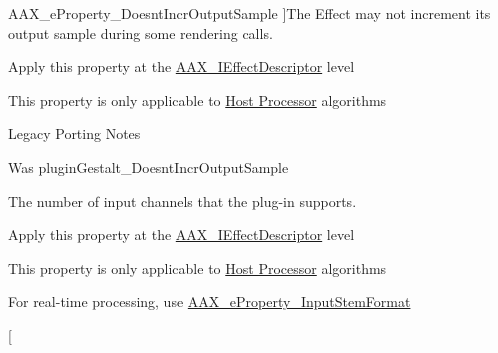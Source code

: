 \begin{Desc}
\begin{description}
{\hypertarget{a00283_a6571f4e41a5dd06e4067249228e2249eaaf6b47f0861af74ef5c5bb316481b97d}{}A\+A\+X\+\_\+e\+Property\+\_\+\+Doesnt\+Incr\+Output\+Sample\label{a00283_a6571f4e41a5dd06e4067249228e2249eaaf6b47f0861af74ef5c5bb316481b97d}
}]The Effect may not increment its output sample during some rendering calls. \begin{DoxyItemize}
\item Apply this property at the \hyperlink{a00096}{A\+A\+X\+\_\+\+I\+Effect\+Descriptor} level \item This property is only applicable to \hyperlink{a00334}{Host Processor} algorithms\end{DoxyItemize}
\begin{DoxyRefDesc}{Legacy Porting Notes}
\item[\hyperlink{a00384__porting_notes000057}{Legacy Porting Notes}]Was plugin\+Gestalt\+\_\+\+Doesnt\+Incr\+Output\+Sample \end{DoxyRefDesc}
\item[{\em 
\hypertarget{a00283_a6571f4e41a5dd06e4067249228e2249ea00ed3da39077c52ef259f350837fc981}{}A\+A\+X\+\_\+e\+Property\+\_\+\+Number\+Of\+Inputs\label{a00283_a6571f4e41a5dd06e4067249228e2249ea00ed3da39077c52ef259f350837fc981}
}]The number of input channels that the plug-\/in supports. \begin{DoxyItemize}
\item Apply this property at the \hyperlink{a00096}{A\+A\+X\+\_\+\+I\+Effect\+Descriptor} level \item This property is only applicable to \hyperlink{a00334}{Host Processor} algorithms\end{DoxyItemize}
For real-\/time processing, use \hyperlink{a00283_a6571f4e41a5dd06e4067249228e2249eadebf03028b758123965a8b988fa2df99}{A\+A\+X\+\_\+e\+Property\+\_\+\+Input\+Stem\+Format} \item[{\em 
}
\end{description}
\end{Desc}
